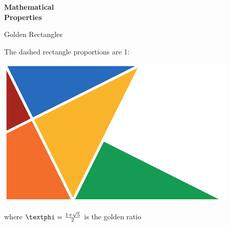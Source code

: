 \documentclass[14pt]{beamer}
\begin{document}

    \begin{frame}{}
        \begin{center}
            \textbf{\Huge Mathematical\\\bigskip Properties}\\
        \end{center}
    \end{frame}


    \begin{frame}{Golden Rectangles}
        \begin{center}
            The dashed rectangle proportions are 1:\textphi
        \end{center}
        \hspace{4.1em} \includegraphics[scale=1.0]{figures/figure030a.pdf} \\
        \begin{center}
            where $\text{\textphi} =\tfrac{1+\sqrt{5}}{2}$ is the golden ratio
        \end{center}
    \end{frame}

\end{document}
